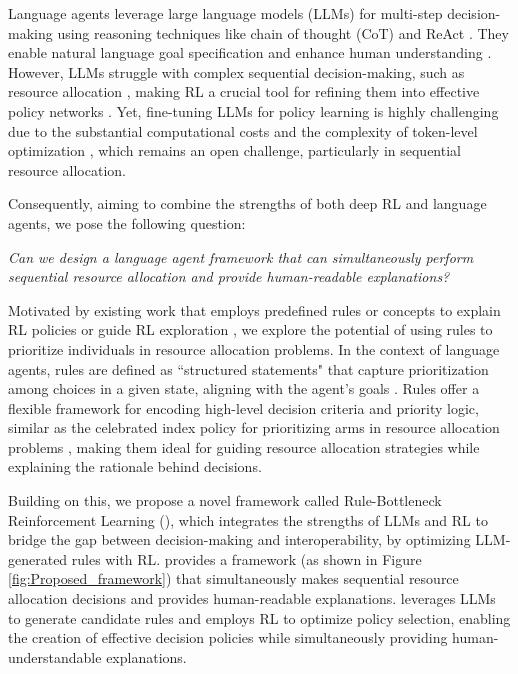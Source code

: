 Language agents \cite{sumers2024cognitive} leverage large language models (LLMs) for multi-step decision-making using reasoning techniques like chain of thought (CoT) \cite{wei2022chain} and ReAct \cite{yao2023react}. They enable natural language goal specification \cite{du2023guiding} and enhance human understanding \cite{hu2023language, srivastava2024policy}. However, LLMs struggle with complex sequential decision-making, such as resource allocation \cite{furuta2024exposing}, making RL a crucial tool for refining them into effective policy networks \cite{carta2023grounding, tantrue, wen2024reinforcing, zhai2024fine}. Yet, fine-tuning LLMs for policy learning is highly challenging due to the substantial computational costs and the complexity of token-level optimization \cite{rashid2024critical}, which remains an open challenge, particularly in sequential resource allocation.

Consequently, aiming to combine the strengths of both deep RL and language agents, we pose the following question:


\vspace{-0.1in}
\begin{tcolorbox}[colback=white!5!white,colframe=white!75!white]
\textit{%
Can we design a language agent framework that can simultaneously perform sequential resource allocation and provide human-readable explanations? }
\end{tcolorbox}
\vspace{-0.15in}






Motivated by existing work that employs predefined rules or concepts to explain RL policies \cite{Das2023State2Explanation} or guide RL exploration \cite{likmeta2020combining}, we explore the potential of using rules to prioritize individuals in resource allocation problems. In the context of language agents, rules are defined as ``structured statements" that capture prioritization among choices in a given state, aligning with the agent's goals \cite{srivastava2024policy}. 
Rules offer a flexible framework for encoding high-level decision criteria and priority logic, similar as the celebrated index policy for prioritizing arms in resource allocation problems \cite{whittle1988restless}, making them ideal for guiding resource allocation strategies while explaining the rationale behind decisions.%



Building on this, we propose a novel framework called Rule-Bottleneck Reinforcement Learning (\rbrl), which integrates the strengths of LLMs and RL to bridge the gap between decision-making and interoperability, by optimizing LLM-generated rules with RL. 
\rbrl provides a framework (as shown in Figure \ref{fig:Proposed_framework}) that simultaneously makes sequential resource allocation decisions and provides human-readable explanations. \rbrl leverages LLMs to generate candidate rules and employs RL to optimize policy selection, enabling the creation of effective decision policies while simultaneously providing human-understandable explanations. 

